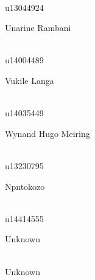 \documentclass[a4paper,12pt]{report}
\begin{document}
\begin{titlepage}
\begin{center}
\begin{minipage}{0.4\textwidth}
\end{minipage}
\begin{minipage}{0.4\textwidth}
\begin{flushright} \large
\emph{} \\
u13044924
\end{flushright}
\end{minipage}
\begin{minipage}{0.4\textwidth}
\begin{flushleft} \large
Unarine {Rambani}
\end{flushleft}
\end{minipage}
\begin{minipage}{0.4\textwidth}
\begin{flushright} \large
\emph{} \\
u14004489
\end{flushright}
\end{minipage}
\begin{minipage}{0.4\textwidth}
\begin{flushleft} \large
Vukile {Langa}
\end{flushleft}
\end{minipage}
\begin{minipage}{0.4\textwidth}
\begin{flushright} \large
\emph{} \\
u14035449 
\end{flushright}
\end{minipage}
\begin{minipage}{0.4\textwidth}
\begin{flushleft} \large
Wynand Hugo {Meiring}
\end{flushleft}
\end{minipage}
\begin{minipage}{0.4\textwidth}
\begin{flushright} \large
\emph{} \\
u13230795  
\end{flushright}
\end{minipage}
\begin{minipage}{0.4\textwidth}
\begin{flushleft} \large
Npntokozo
\end{flushleft}
\end{minipage}
\begin{minipage}{0.4\textwidth}
\begin{flushright} \large
\emph{} \\
u14414555
\end{flushright}
\end{minipage}
\begin{minipage}{0.4\textwidth}
\begin{flushleft} \large
Unknown
\end{flushleft}
\end{minipage}
\begin{minipage}{0.4\textwidth}
\begin{flushright} \large
\emph{} \\
Unknown
\end{flushright}
\end{minipage}
\vfill


\end{center}
\end{titlepage}
\end{document}
